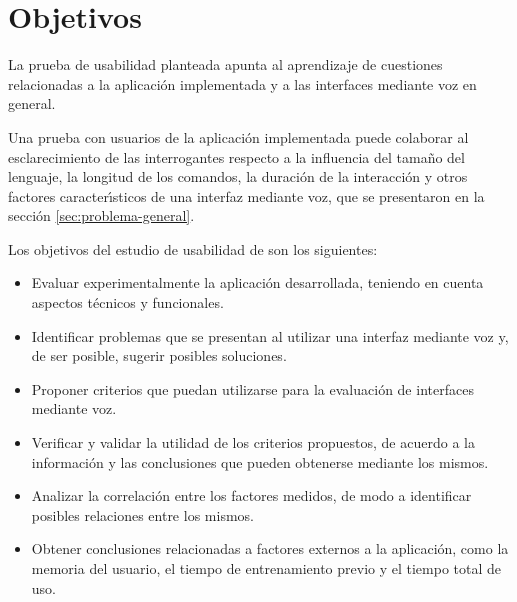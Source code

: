 \section{Objetivos}
\label{sec:objetivos-estudio}

La prueba de usabilidad planteada apunta al aprendizaje de cuestiones relacionadas
a la aplicaci\'on implementada y a las interfaces mediante voz en general.

Una prueba con usuarios de la aplicaci\'on implementada puede colaborar al esclarecimiento de 
las interrogantes respecto a la influencia del tama\~no del lenguaje, la longitud de
los comandos, la duraci\'on de la interacci\'on y otros factores caracter{\'\i}sticos de una
interfaz mediante voz, que se presentaron en la secci\'on \ref{sec:problema-general}.

Los objetivos del estudio de usabilidad de  son los siguientes:

\begin{itemize}
	\item Evaluar experimentalmente la aplicaci\'on desarrollada, teniendo en cuenta 
	aspectos t\'ecnicos y funcionales.
	\item Identificar problemas que se presentan al utilizar una interfaz mediante voz y,
	 de ser posible, sugerir posibles soluciones.
	\item Proponer criterios que puedan utilizarse para la evaluaci\'on de interfaces 
	mediante voz.
	\item Verificar y validar la utilidad de los criterios propuestos, de acuerdo a 
	la informaci\'on y las conclusiones que pueden obtenerse mediante los mismos.
	\item Analizar la correlaci\'on entre los factores medidos, de modo a identificar
	posibles relaciones entre los mismos. 
	\item Obtener conclusiones relacionadas a factores externos a la aplicaci\'on, 
	como la memoria del usuario, el tiempo de entrenamiento previo y el tiempo
	total de uso.
\end{itemize}